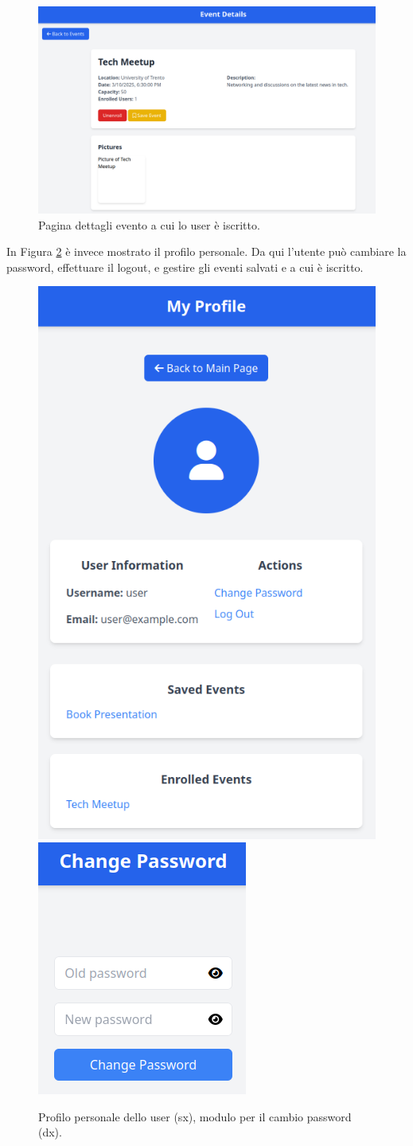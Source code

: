 \documentclass[9pt]{extarticle}
\begin{document}
\newpage

\begin{figure}[!htb]
	\centering
	\includegraphics[width=0.9\linewidth]{./images/EventDetails3.png}
	\caption{Pagina dettagli evento a cui lo user è iscritto.}
	\label{fig:eventDetails3}
\end{figure}

In Figura \ref{fig:profile} è invece mostrato il profilo personale. Da qui l'utente può cambiare la password, effettuare il logout, e gestire gli eventi salvati e a cui è iscritto.

\begin{figure}[!htb]
	\centering
	\includegraphics[width=0.4\linewidth]{./images/Profile.png}
	\hspace{1cm}
	\includegraphics[width=0.25\linewidth]{./images/changePwd.png}
	\caption{Profilo personale dello user (sx), modulo per il cambio password (dx).}
	\label{fig:profile}
\end{figure}
\newpage
\end{document}
